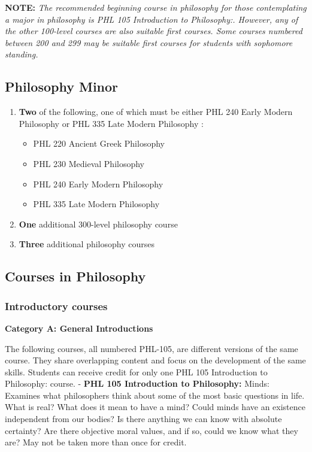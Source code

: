 \documentclass[
  letterpaper,
]{scrbook}
\providecommand{\tightlist}{%
  \setlength{\itemsep}{0pt}\setlength{\parskip}{0pt}}
\begin{document}
\textbf{NOTE:} \emph{The recommended beginning course in philosophy for
those contemplating a major in philosophy is PHL 105 Introduction to
Philosophy:. However, any of the other 100-level courses are also
suitable first courses. Some courses numbered between 200 and 299 may be
suitable first courses for students with sophomore standing.}

\subsection{Philosophy Minor}\label{philosophy-minor}

\begin{enumerate}
\def\labelenumi{\arabic{enumi}.}
\item
  \textbf{Two} of the following, one of which must be either PHL 240
  Early Modern Philosophy or PHL 335 Late Modern Philosophy :

  \begin{itemize}
  \tightlist
  \item
    PHL 220 Ancient Greek Philosophy
  \item
    PHL 230 Medieval Philosophy
  \item
    PHL 240 Early Modern Philosophy
  \item
    PHL 335 Late Modern Philosophy
  \end{itemize}
\item
  \textbf{One} additional 300-level philosophy course
\item
  \textbf{Three} additional philosophy courses
\end{enumerate}

\subsection{Courses in Philosophy}\label{courses-in-philosophy}

\subsubsection*{Introductory courses}\label{introductory-courses}

\textbf{Category A: General Introductions}

The following courses, all numbered PHL-105, are different versions of
the same course. They share overlapping content and focus on the
development of the same skills. Students can receive credit for only one
PHL 105 Introduction to Philosophy: course. - \textbf{PHL 105
Introduction to Philosophy:} Minds: Examines what philosophers think
about some of the most basic questions in life. What is real? What does
it mean to have a mind? Could minds have an existence independent from
our bodies? Is there anything we can know with absolute certainty? Are
there objective moral values, and if so, could we know what they are?
May not be taken more than once for credit.
\end{document}
